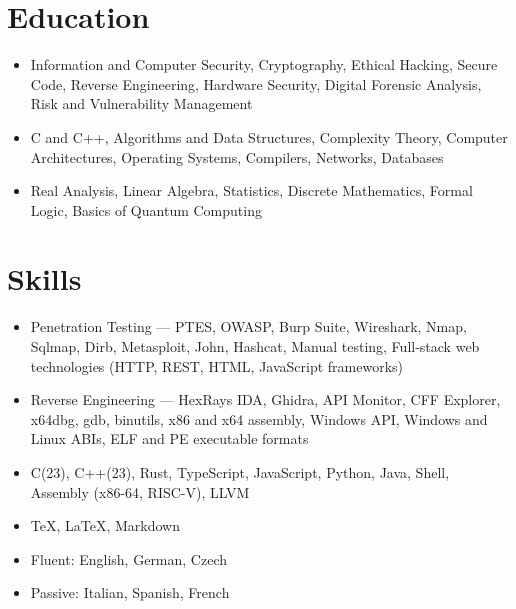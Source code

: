 \documentclass{customcv}
\begin{document}
\section{Education}
    
    \begin{itemize}
      \item Information and Computer Security, Cryptography, Ethical Hacking, Secure Code, Reverse Engineering, Hardware Security, Digital Forensic Analysis, Risk and Vulnerability Management

      \item C and C++, Algorithms and Data Structures, Complexity Theory, Computer Architectures, Operating Systems, Compilers, Networks, Databases

      \item Real Analysis, Linear Algebra, Statistics, Discrete Mathematics, Formal Logic,
      Basics of Quantum Computing
    \end{itemize}

    
\section{Skills}
    \begin{itemize}
      \item Penetration Testing --- PTES, OWASP, Burp Suite, Wireshark, Nmap, Sqlmap, Dirb, Metasploit, John, Hashcat,
      Manual testing, Full-stack web technologies (HTTP, REST, HTML, JavaScript frameworks)
      
      \item Reverse Engineering --- HexRays IDA, Ghidra, API Monitor, CFF Explorer, x64dbg, gdb, binutils, x86 and x64 assembly, Windows API, Windows and Linux ABIs, ELF and PE executable formats
    \end{itemize}

    \begin{itemize}
      \item C(23), C++(23), Rust, TypeScript, JavaScript, Python, Java, Shell, Assembly (x86-64, RISC-V), LLVM

      \item \TeX, \LaTeX, Markdown
    \end{itemize}

    \begin{itemize}
      \item Fluent: English, German, Czech
      
      \item Passive: Italian, Spanish, French
    \end{itemize}
\end{document}

